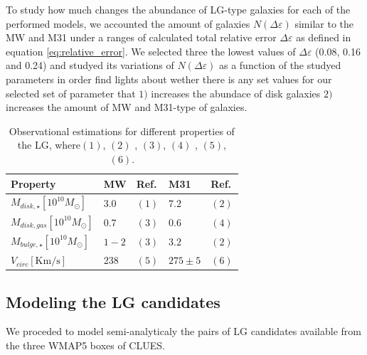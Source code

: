 \documentclass[usenatbib]{mn2e}
\begin{document}
To study how much changes the abundance of LG-type galaxies for each of the performed models, we accounted the amount of galaxies $N(\Delta \varepsilon)$
similar to the MW and M31 under a ranges of calculated total relative error  $\Delta \varepsilon$ as defined in equation \ref{eq:relative_error}. We selected 
three the lowest values of $\Delta \varepsilon$ (0.08, 0.16 and 0.24) and studyed its variations of $N(\Delta \varepsilon)$ as a function of the studyed 
parameters in order find lights about wether there is any set values for our selected set of parameter that $1)$ increases the abundace of disk galaxies $2)$
increases the amount of MW and M31-type of galaxies.
 
\begin{table}
\centering
\begin{tabular}{|l|l|l|l|l|}
\hline
\hline
 Property &  MW &  Ref. & M31 & Ref.\\
\hline
$M_{disk,\star}[10^{10}M_{\odot}]$ & $3.0 $ &  $(1)$ & $7.2$ & $(2)$ \\
$M_{disk,gas}[10^{10}M_{\odot}]$ & $0.7$ &  $(3)$ & $0.6$ &  $(4)$ \\
$M_{bulge,\star}[10^{10}M_{\odot}]$ & $1-2$ & $(3)$ & $3.2$ &  $(2)$ \\
$V_{circ}[\text{Km/s}]$ & $238$ &  $(5)$ & $275\pm 5$ & $(6)$ \\
\hline
\hline
\end{tabular}
\caption{Observational estimations for different properties of the LG, where$(1)$\citet{2001ApJ...555..393Z},
$(2)$ \citet{2006MNRAS.366..996G}, $(3)$\citet{2009A&A...505..497Y}, $(4)$ \citet{2006A&A...453..459N}, $(5)$\citet{2005MNRAS.364..433B}, 
$(6)$\citet{2008MNRAS.389.1911S}.
}
\label{tab:lg-observations}
\end{table}

\subsection{Modeling the LG candidates}
\label{sec:modeling-lg}
We proceded to model semi-analyticaly the  pairs of LG candidates  available from the three WMAP5 boxes of CLUES.
\end{document}

